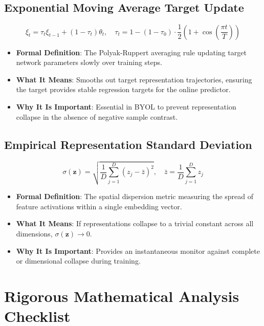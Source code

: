\documentclass[11pt,a4paper]{article}
\theoremstyle{definition}
\begin{document}
\subsection{Exponential Moving Average Target Update}
{\boldmath
\begin{equation}
\xi_t = \tau_t \xi_{t-1} + (1 - \tau_t) \theta_t, \quad \tau_t = 1 - (1 - \tau_0) \cdot \frac{1}{2}\left( 1 + \cos\left( \frac{\pi t}{T} \right) \right)
\end{equation}
}
\begin{itemize}
    \item \textbf{Formal Definition}: The Polyak-Ruppert averaging rule updating target network parameters slowly over training steps.
    \item \textbf{What It Means}: Smooths out target representation trajectories, ensuring the target provides stable regression targets for the online predictor.
    \item \textbf{Why It Is Important}: Essential in BYOL to prevent representation collapse in the absence of negative sample contrast.
\end{itemize}

\subsection{Empirical Representation Standard Deviation}
{\boldmath
\begin{equation}
\sigma(\mathbf{z}) = \sqrt{\frac{1}{D} \sum_{j=1}^D (z_j - \bar{z})^2}, \quad \bar{z} = \frac{1}{D}\sum_{j=1}^D z_j
\end{equation}
}
\begin{itemize}
    \item \textbf{Formal Definition}: The spatial dispersion metric measuring the spread of feature activations within a single embedding vector.
    \item \textbf{What It Means}: If representations collapse to a trivial constant across all dimensions, $\sigma(\mathbf{z}) \to 0$.
    \item \textbf{Why It Is Important}: Provides an instantaneous monitor against complete or dimensional collapse during training.
\end{itemize}

\section{Rigorous Mathematical Analysis Checklist}
\end{document}
